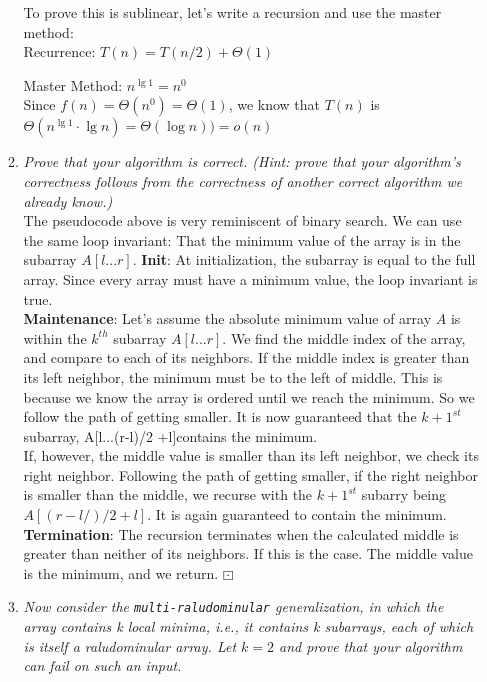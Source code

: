 \documentclass[12pt]{article}
\begin{document}
\begin{enumerate}
\begin{enumerate}
	    To prove this is sublinear, let's write a recursion and use the master method:\\
	    
	    Recurrence: $T(n) = T(n/2) + \Theta(1)$
	    
	    Master Method: $n^{\lg 1} = n^0$\\
	    Since $f(n)= \Theta(n^0) = \Theta(1)$, we know that $T(n)$ is $\boxed{\Theta(n^{\lg 1}\cdot \lg n) = \Theta(\log n)) = o(n)}$
	
          \item \textit{Prove that your algorithm is correct. (Hint: prove that your algorithm's correctness follows from the correctness of another correct algorithm we already know.)}\\
          
          The pseudocode above is very reminiscent of binary search. We can use the same loop invariant: That the minimum value of the array is in the subarray $A[l ... r]$.
          \textbf{Init}: At initialization, the subarray is equal to the full array. Since every array must have a minimum value, the loop invariant is true.\\
          \textbf{Maintenance}: Let's assume the absolute minimum value of array $A$ is within the $k^{th}$ subarray $A[l...r]$. We find the middle index of the array, and compare to each of its neighbors. If the middle index is greater than its left neighbor, the minimum must be to the left of middle. This is because we know the array is ordered until we reach the minimum. So we follow the path of getting smaller. It is now guaranteed that the $k+1^{st}$ subarray, A[l...(r-l)/2 +l]contains the minimum.\\
          If, however, the middle value is smaller than its left neighbor, we check its right neighbor. Following the path of getting smaller, if the right neighbor is smaller than the middle, we recurse with the $k+1^{st}$ subarry being $A[(r-l/)/2 + l]$. It is again guaranteed to contain the minimum.\\
          \textbf{Termination}: The recursion terminates when the calculated middle is greater than neither of its neighbors. If this is the case. The middle value is the minimum, and we return. $\boxdot$
	
          \item \textit{Now consider the \texttt{multi-raludominular} generalization, in which the array contains k local minima, i.e., it contains k subarrays, each of which is itself a raludominular array. Let $k = 2$ and prove that your algorithm can fail on such an input.}


\end{enumerate}
\end{enumerate}
\end{document}

